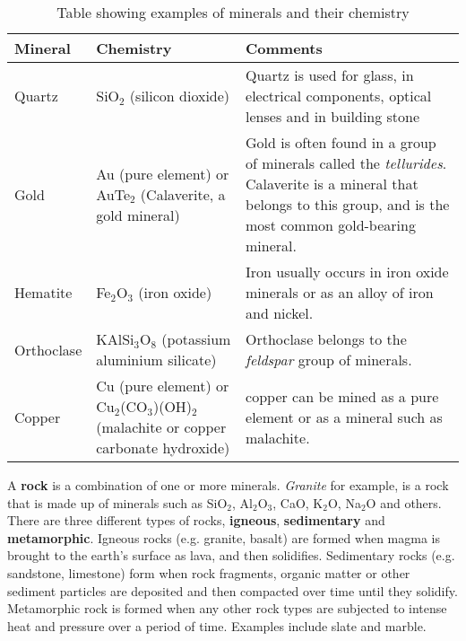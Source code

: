 \begin{table}[H]
\begin{center}
\caption{Table showing examples of minerals and their chemistry}
\label{tab:minerals}
\begin{tabular}{|l|p{3.5cm}|p{6.5cm}|}\hline
\textbf{Mineral} & \textbf{Chemistry} & \textbf{Comments}\\\hline
Quartz & SiO$_{2}$ (silicon dioxide) & Quartz is used for glass, in electrical components, optical lenses and in building stone \\\hline
Gold & Au (pure element) or AuTe$_{2}$ (Calaverite, a gold mineral) & Gold is often found in a group of minerals called the \textit{tellurides}. Calaverite is a mineral that belongs to this group, and is the most common gold-bearing mineral. \\\hline
Hematite & Fe$_{2}$O$_{3}$ (iron oxide) & Iron usually occurs in iron oxide minerals or as an alloy of iron and nickel. \\\hline
Orthoclase & KAlSi$_{3}$O$_{8}$ (potassium aluminium silicate) & Orthoclase belongs to the \textit{feldspar} group of minerals. \\\hline
Copper & Cu (pure element) or Cu$_{2}$(CO$_{3}$)(OH)$_{2}$ (malachite or copper carbonate hydroxide) & copper can be mined as a pure element or as a mineral such as malachite. \\\hline
\end{tabular}
\end{center}
\end{table}


A \textbf{rock} is a combination of one or more minerals. \textit{Granite} for example, is a rock that is made up of minerals such as SiO$_{2}$, Al$_{2}$O$_{3}$, CaO, K$_{2}$O, Na$_{2}$O and others. There are three different types of rocks, \textbf{igneous}, \textbf{sedimentary} and \textbf{metamorphic}. Igneous rocks (e.g. granite, basalt) are formed when magma is brought to the earth's surface as lava, and then solidifies. Sedimentary rocks (e.g. sandstone, limestone) form when rock fragments, organic matter or other sediment particles are deposited and then compacted over time until they solidify. Metamorphic rock is formed when any other rock types are subjected to intense heat and pressure over a period of time. Examples include slate and marble.\\



